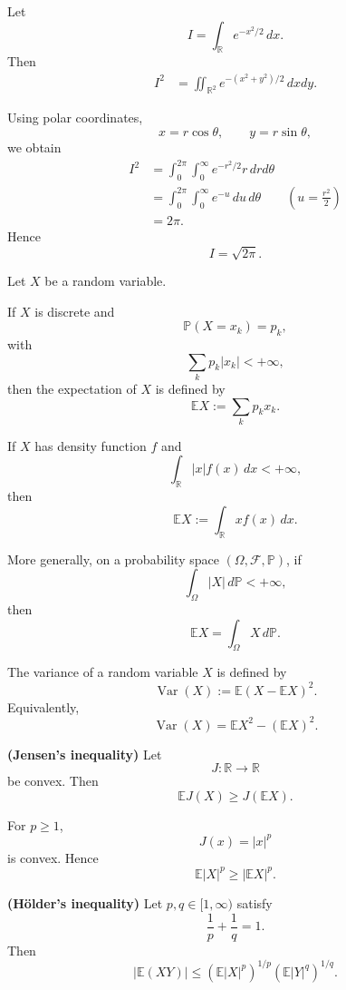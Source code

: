 \begin{proofenv}
Let
\[
    I=\int_{\mathbb R}e^{-x^2/2}\,dx.
\]
Then
\[
\begin{aligned}
    I^2
    &=
    \iint_{\mathbb R^2}
    e^{-(x^2+y^2)/2}\,dxdy .
\end{aligned}
\]

Using polar coordinates,
\[
    x=r\cos\theta,\qquad y=r\sin\theta,
\]
we obtain
\[
\begin{aligned}
    I^2
    &=
    \int_0^{2\pi}
    \int_0^\infty
    e^{-r^2/2}r\,drd\theta\\
    &=
    \int_0^{2\pi}
    \int_0^\infty
    e^{-u}\,du\,d\theta
    \qquad
    \left(u=\frac{r^2}{2}\right)\\
    &=2\pi .
\end{aligned}
\]
Hence
\[
    I=\sqrt{2\pi}.
\]
\end{proofenv}

\begin{definitionenv}
Let $X$ be a random variable.

If $X$ is discrete and
\[
    \mathbb P(X=x_k)=p_k,
\]
with
\[
    \sum_k p_k|x_k|<+\infty,
\]
then the expectation of $X$ is defined by
\[
    \mathbb EX
    :=
    \sum_k p_kx_k.
\]
\end{definitionenv}


\begin{definitionenv}
If $X$ has density function $f$ and
\[
    \int_{\mathbb R}|x|f(x)\,dx<+\infty,
\]
then
\[
    \mathbb EX
    :=
    \int_{\mathbb R}x f(x)\,dx.
\]
\end{definitionenv}


\begin{remark}
More generally, on a probability space $(\Omega,\mathcal F,\mathbb P)$,
if
\[
    \int_\Omega |X|\,d\mathbb P<+\infty,
\]
then
\[
    \mathbb EX
    =
    \int_\Omega X\,d\mathbb P.
\]
\end{remark}

\begin{definitionenv}
The variance of a random variable $X$ is defined by
\[
    \operatorname{Var}(X)
    :=
    \mathbb E(X-\mathbb EX)^2.
\]
Equivalently,
\[
    \operatorname{Var}(X)
    =
    \mathbb EX^2-(\mathbb EX)^2.
\]
\end{definitionenv}


\begin{theoremenv}
\textbf{(Jensen's inequality)}
Let
\[
    J:\mathbb R\to\mathbb R
\]
be convex. Then
\[
    \mathbb E J(X)
    \ge
    J(\mathbb EX).
\]
\end{theoremenv}


\begin{exampleenv}
For $p\ge1$,
\[
    J(x)=|x|^p
\]
is convex. Hence
\[
    \mathbb E|X|^p
    \ge
    |\mathbb EX|^p.
\]
\end{exampleenv}


\begin{theoremenv}
\textbf{(Hölder's inequality)}
Let $p,q\in[1,\infty)$ satisfy
\[
    \frac1p+\frac1q=1.
\]
Then
\[
    |\mathbb E(XY)|
    \le
    (\mathbb E|X|^p)^{1/p}
    (\mathbb E|Y|^q)^{1/q}.
\]
\end{theoremenv}